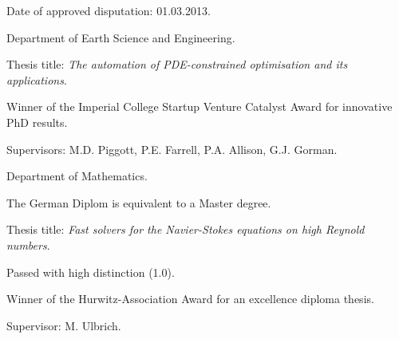 \documentclass[11pt]{article}
\newenvironment{outerlist}[1][\enskip\textbullet]
        {\begin{itemize}[ #1]}{\end{itemize}}
\newenvironment{innerlist}[1][\enskip\textbullet]
        {\begin{compactitem}[#1]}{\end{compactitem}}
\begin{document}
\begin{outerlist}
\item[] 
        \begin{innerlist}
            \item Date of approved disputation: 01.03.2013.
            \item Department of Earth Science and Engineering.
            \item Thesis title: \textit{The automation of PDE-constrained optimisation and its applications}.
            \item Winner of the Imperial College Startup Venture Catalyst Award for innovative PhD results.
            \item Supervisors: M.D. Piggott, P.E. Farrell, P.A. Allison, G.J. Gorman.
        \end{innerlist}
\item[] 
            \begin{innerlist}
                \item Department of Mathematics.
                \item The German Diplom is equivalent to a Master degree.
                \item Thesis title: \textit{Fast solvers for the Navier-Stokes equations on high Reynold numbers}.
                \item Passed with high distinction (1.0).
                \item Winner of the {{Hurwitz-Association Award}} for an excellence diploma thesis.
                \item Supervisor: M. Ulbrich.
            \end{innerlist}
\item[] 
\end{outerlist}
\end{document}
